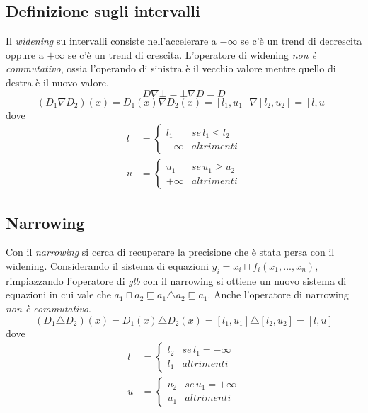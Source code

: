 \documentclass[a4paper,oneside,titlepage]{book}
\begin{document}
\subsection{Definizione sugli intervalli}
Il \textit{widening} su intervalli consiste nell'accelerare a $- \infty$ se c’è un trend di decrescita oppure a $+ \infty$ se c'è un trend di crescita. L'operatore di widening \textit{non è commutativo}, ossia l'operando di sinistra è il vecchio valore mentre quello di destra è il nuovo valore.
\newpage
\[ D \nabla \bot = \bot \nabla D = D \]
\[ (D_1 \nabla D_2)(x) = D_1(x) \nabla D_2(x) = [l_1,u_1] \nabla [l_2,u_2] = [l,u] \]
dove
\begin{align*}
    l &=
        \begin{cases}
            l_1 & se \, l_1 \leq l_2 \\
            - \infty & altrimenti
        \end{cases} \\
    u &=
        \begin{cases}
            u_1 & se \, u_1 \geq u_2 \\
            + \infty & altrimenti
        \end{cases}
\end{align*}

\subsection{Narrowing}
Con il \textit{narrowing} si cerca di recuperare la precisione che è stata persa con il widening. Considerando il sistema di equazioni $y_i = x_i \sqcap f_i(x_1,...,x_n)$, rimpiazzando l'operatore di \textit{glb} con il narrowing si ottiene un nuovo sistema di equazioni in cui vale che $a_1 \sqcap a_2 \sqsubseteq a_1 \triangle a_2 \sqsubseteq a_1$. Anche l'operatore di narrowing \textit{non è commutativo}.
\[ (D_1 \triangle D_2)(x) = D_1(x) \triangle D_2(x) = [l_1,u_1] \triangle [l_2,u_2] = [l,u] \]
dove
\begin{align*}
    l &=
        \begin{cases}
            l_2 & se \, l_1 = - \infty \\
            l_1 & altrimenti
        \end{cases} \\
    u &=
        \begin{cases}
            u_2 & se \, u_1 = + \infty \\
            u_1 & altrimenti
        \end{cases}
\end{align*}
\end{document}
